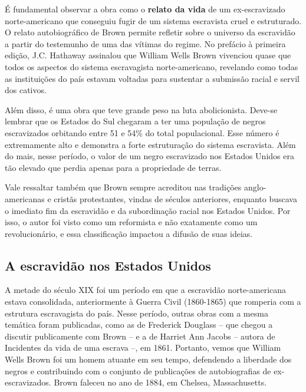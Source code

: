 \documentclass[11pt]{extarticle}
\begin{document}
É fundamental observar a obra como o \textbf{relato da vida} de um
ex-escravizado norte-americano que conseguiu fugir de um sistema
escravista cruel e estruturado. O relato autobiográfico de Brown permite
refletir sobre o universo da escravidão a partir do testemunho de uma
das vítimas do regime. No prefácio à primeira edição, J.C. Hathaway
assinalou que William Wells Brown vivenciou quase que todos os aspectos
do sistema escravagista norte-americano, revelando como todas as
instituições do país estavam voltadas para sustentar a submissão racial
e servil dos cativos.

Além disso, é uma obra que teve grande peso na luta abolicionista.
Deve-se lembrar que os Estados do Sul chegaram a ter uma população de
negros escravizados orbitando entre 51 e 54\% do total populacional.
Esse número é extremamente alto e demonstra a forte estruturação do
sistema escravista. Além do mais, nesse período, o valor de um negro
escravizado nos Estados Unidos era tão elevado que perdia apenas para a
propriedade de terras.

Vale ressaltar também que Brown sempre acreditou nas tradições
anglo-americanas e cristãs protestantes, vindas de séculos anteriores,
enquanto buscava o imediato fim da escravidão e da subordinação racial
nos Estados Unidos. Por isso, o autor foi visto como um reformista e não
exatamente como um revolucionário, e essa classificação impactou a
difusão de suas ideias.


\subsection{A escravidão nos Estados Unidos}

A metade do século XIX foi um período em que a escravidão
norte-americana estava consolidada, anteriormente à Guerra Civil
(1860-1865) que romperia com a estrutura escravagista do país. Nesse
período, outras obras com a mesma temática foram publicadas, como as de
Frederick Douglass -- que chegou a discutir publicamente com Brown -- e
a de Harriet Ann Jacobs -- autora de Incidentes da vida de uma escrava
--, em 1861. Portanto, vemos que William Wells Brown foi um homem
atuante em seu tempo, defendendo a liberdade dos negros e contribuindo
com o conjunto de publicações de autobiografias de ex-escravizados.
Brown faleceu no ano de 1884, em Chelsea, Massachusetts.
\end{document}

